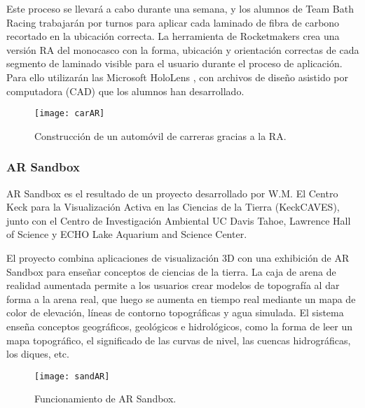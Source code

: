 Este proceso se llevará a cabo durante una semana, y los alumnos de Team Bath Racing trabajarán por turnos para aplicar cada laminado de fibra de carbono recortado en la ubicación correcta. La herramienta de Rocketmakers crea una versión RA del monocasco con la forma, ubicación y orientación correctas de cada segmento de laminado visible para el usuario durante el proceso de aplicación. Para ello utilizarán las Microsoft HoloLens \cite{URL::hololens}, con archivos de diseño asistido por computadora (CAD) que los alumnos han desarrollado.

\begin{figure}[h]
    \centering
    \texttt{[image: carAR]}
    \caption{Construcción de un automóvil de carreras gracias a la RA.}
    \label{fig:xyz}
\end{figure}    
 

\subsubsection{AR Sandbox} 
AR Sandbox \cite{URL::sandbox} es el resultado de un proyecto desarrollado por W.M. El Centro Keck para la Visualización Activa en las Ciencias de la Tierra (KeckCAVES), junto con el Centro de Investigación Ambiental UC Davis Tahoe, Lawrence Hall of Science y ECHO Lake Aquarium and Science Center.

El proyecto combina aplicaciones de visualización 3D con una exhibición de AR Sandbox para enseñar conceptos de ciencias de la tierra. La caja de arena de realidad aumentada  permite a los usuarios crear modelos de topografía al dar forma a la arena real, que luego se aumenta en tiempo real mediante un mapa de color de elevación, líneas de contorno topográficas y agua simulada. El sistema enseña conceptos geográficos, geológicos e hidrológicos, como la forma de leer un mapa topográfico, el significado de las curvas de nivel, las cuencas hidrográficas, los diques, etc.

\begin{figure}[h]
    \centering
    \texttt{[image: sandAR]}
    \caption{Funcionamiento de AR Sandbox.}
    \label{fig:xyz}
\end{figure}    



